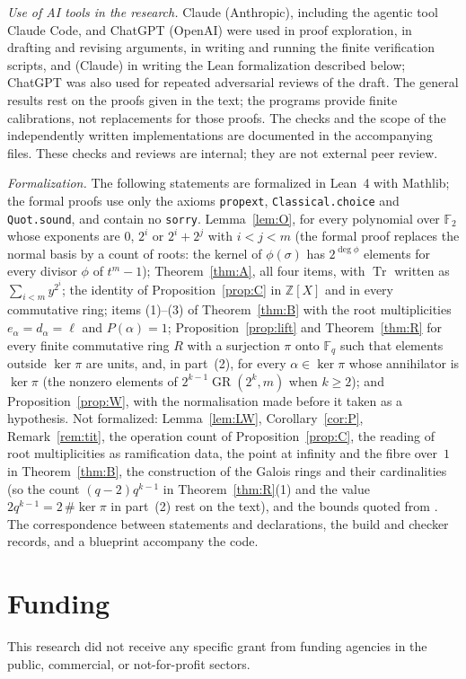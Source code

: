 \documentclass[preprint,12pt]{elsarticle}
\theoremstyle{definition}
\newcommand{\F}{\mathbb{F}}
\newcommand{\Z}{\mathbb{Z}}
\newcommand{\Tr}{\operatorname{Tr}}
\newcommand{\GR}{\operatorname{GR}}
\begin{document}
\emph{Use of AI tools in the research.} Claude (Anthropic), including the agentic tool Claude Code, and ChatGPT (OpenAI) were used in proof exploration, in drafting and revising arguments, in writing and running the finite verification scripts, and (Claude) in writing the Lean formalization described below; ChatGPT was also used for repeated adversarial reviews of the draft. The general results rest on the proofs given in the text; the programs provide finite calibrations, not replacements for those proofs. The checks and the scope of the independently written implementations are documented in the accompanying files. These checks and reviews are internal; they are not external peer review.

\emph{Formalization.} The following statements are formalized in Lean~4 with Mathlib; the formal proofs use only the axioms \texttt{propext}, \texttt{Classical.choice} and \texttt{Quot.sound}, and contain no \texttt{sorry}. Lemma~\ref{lem:O}, for every polynomial over $\F_2$ whose exponents are $0$, $2^i$ or $2^i+2^j$ with $i<j<m$ (the formal proof replaces the normal basis by a count of roots: the kernel of $\phi(\sigma)$ has $2^{\deg\phi}$ elements for every divisor $\phi$ of $t^m-1$); Theorem~\ref{thm:A}, all four items, with $\Tr$ written as $\sum_{i<m}y^{2^i}$; the identity of Proposition~\ref{prop:C} in $\Z[X]$ and in every commutative ring; items (1)--(3) of Theorem~\ref{thm:B} with the root multiplicities $e_\alpha=d_\alpha=\ell$ and $P(\alpha)=1$; Proposition~\ref{prop:lift} and Theorem~\ref{thm:R} for every finite commutative ring $R$ with a surjection $\pi$ onto $\F_q$ such that elements outside $\ker\pi$ are units, and, in part~(2), for every $\alpha\in\ker\pi$ whose annihilator is $\ker\pi$ (the nonzero elements of $2^{k-1}\GR(2^k,m)$ when $k\ge2$); and Proposition~\ref{prop:W}, with the normalisation made before it taken as a hypothesis. Not formalized: Lemma~\ref{lem:LW}, Corollary~\ref{cor:P}, Remark~\ref{rem:tit}, the operation count of Proposition~\ref{prop:C}, the reading of root multiplicities as ramification data, the point at infinity and the fibre over~$1$ in Theorem~\ref{thm:B}, the construction of the Galois rings and their cardinalities (so the count $(q-2)q^{k-1}$ in Theorem~\ref{thm:R}(1) and the value $2q^{k-1}=2\,\#\ker\pi$ in part~(2) rest on the text), and the bounds quoted from \cite{RS}. The correspondence between statements and declarations, the build and checker records, and a blueprint accompany the code.

\section*{Funding}
This research did not receive any specific grant from funding agencies in the public, commercial, or not-for-profit sectors.
\end{document}
